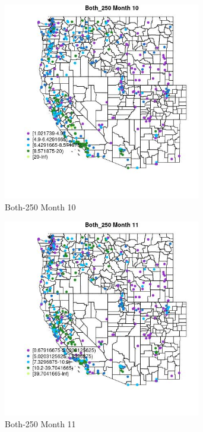 \begin{figure} 
\centering  
\includegraphics[width=0.77\textwidth]{Code_Outputs/ML_input_report_ML_input_PM25_Step5_part_d_de_duplicated_aves_ML_input_MapObsMo10Both_250.jpg} 
\caption{\label{fig:ML_input_report_ML_input_PM25_Step5_part_d_de_duplicated_aves_ML_inputMapObsMo10Both_250}Both-250 Month 10} 
\end{figure} 
 

\begin{figure} 
\centering  
\includegraphics[width=0.77\textwidth]{Code_Outputs/ML_input_report_ML_input_PM25_Step5_part_d_de_duplicated_aves_ML_input_MapObsMo11Both_250.jpg} 
\caption{\label{fig:ML_input_report_ML_input_PM25_Step5_part_d_de_duplicated_aves_ML_inputMapObsMo11Both_250}Both-250 Month 11} 
\end{figure} 
 

